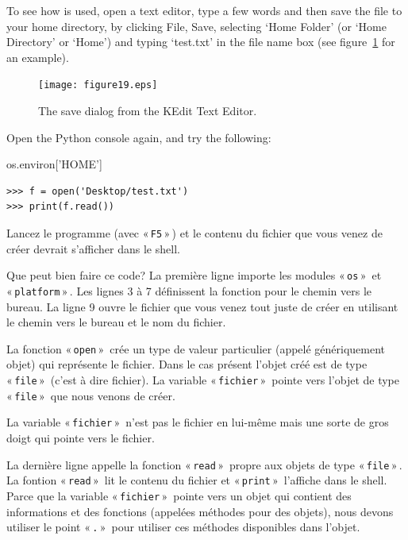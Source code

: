 \begin{LINUX}
To see how  is used, open a text editor, type a few words and then save the file to your home directory, by clicking File, Save, selecting `Home Folder' (or `Home Directory' or `Home') and typing `test.txt' in the file name box (see figure~\ref{fig19} for an example).

\begin{figure}
\begin{center}
\texttt{[image: figure19.eps]}
\end{center}
\caption{The save dialog from the KEdit Text Editor.}\label{fig19}
\end{figure}

Open the Python console again, and try the following:

os.environ['HOME']

\begin{listing}
\begin{verbatim}
>>> f = open('Desktop/test.txt')
>>> print(f.read())
\end{verbatim}
\end{listing}

\end{LINUX}


Lancez le programme (avec « \texttt{F5} » ) et le contenu du fichier que vous venez de créer devrait s'afficher dans le shell. 

Que peut bien faire ce code? La première ligne importe les modules « \texttt{os} »   et « \texttt{platform} » . Les lignes 3 à 7 définissent la fonction pour le chemin vers le bureau.
La ligne 9 ouvre le fichier que vous venez tout juste de créer en utilisant le chemin vers le bureau et le nom du fichier.

La fonction « \texttt{open} »   crée un type de valeur particulier (appelé génériquement objet) qui représente le fichier. Dans le cas présent l'objet créé est de type « \texttt{file} »  (c'est à dire fichier). La variable « \texttt{fichier} »  pointe vers l'objet de type « \texttt{file} »  que nous venons de créer.

La variable « \texttt{fichier} »  n'est pas le fichier en lui-même mais une sorte de gros doigt qui pointe vers le fichier.

La dernière ligne appelle la fonction « \texttt{read} »  propre aux objets de type « \texttt{file} » . La fontion « \texttt{read} »  lit le contenu du fichier et « \texttt{print} »  l'affiche dans le shell. Parce que la variable « \texttt{fichier} »  pointe vers un objet qui contient des informations et des fonctions (appelées méthodes pour des objets), nous devons utiliser le point « \texttt{.} »   pour utiliser ces méthodes disponibles dans l'objet.

